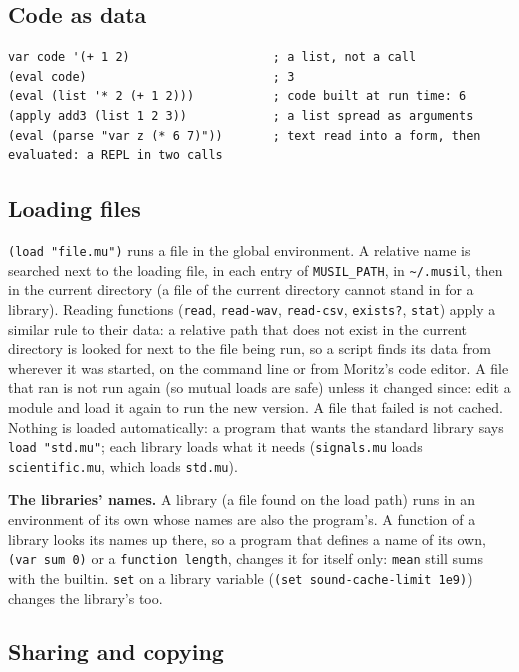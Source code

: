 \documentclass[11pt,a4paper]{article}
\newcommand{\musil}[1]{\lstinline[style=musilinline]{#1}}
\begin{document}
\subsection{Code as data}

\begin{lstlisting}
var code '(+ 1 2)                    ; a list, not a call
(eval code)                          ; 3
(eval (list '* 2 (+ 1 2)))           ; code built at run time: 6
(apply add3 (list 1 2 3))            ; a list spread as arguments
(eval (parse "var z (* 6 7)"))       ; text read into a form, then evaluated: a REPL in two calls
\end{lstlisting}

\subsection{Loading files}

\musil{(load "file.mu")} runs a file in the global environment. A relative name
is searched next to the loading file, in each entry of \texttt{MUSIL\_PATH}, in
\texttt{\textasciitilde/.musil}, then in the current directory (a file of the current
directory cannot stand in for a library). Reading functions
(\musil{read}, \musil{read-wav}, \musil{read-csv}, \musil{exists?}, \musil{stat})
apply a similar rule to their data: a relative path that does not exist in the current
directory is looked for next to the file being run, so a script finds its data from
wherever it was started, on the command line or from Moritz's code editor. A file that ran is not
run again (so mutual loads are safe) unless it changed since: edit a module and load it
again to run the new version. A file that failed is not cached. Nothing is
loaded automatically: a program that wants the standard library says
\musil{load "std.mu"}; each library loads what it needs (\musil{signals.mu} loads
\musil{scientific.mu}, which loads \musil{std.mu}).

\textbf{The libraries' names.} A library (a file found on the load path) runs in an
environment of its own whose names are also the program's. A function of a library looks
its names up there, so a program that defines a name of its own, \musil{(var sum 0)} or a
\musil{function length}, changes it for itself only: \musil{mean} still sums with the
builtin. \musil{set} on a library variable (\musil{(set sound-cache-limit 1e9)}) changes the
library's too.

\subsection{Sharing and copying}
\end{document}
